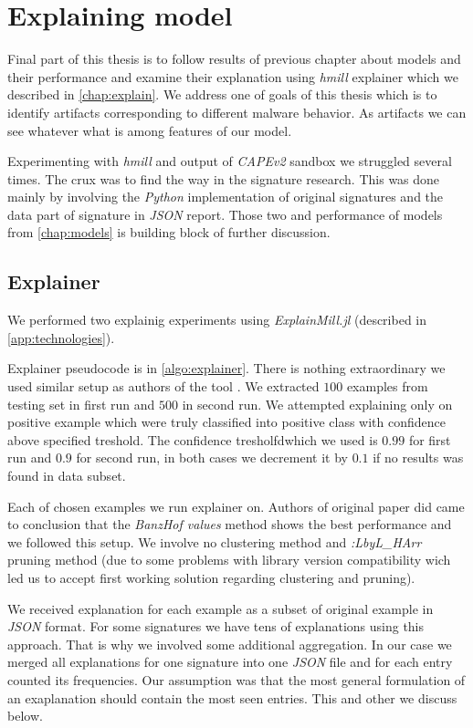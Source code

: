 \chapter{Explaining model} \label{chap:expex}
Final part of this thesis is to follow results of previous chapter about models and their performance and examine their explanation using \emph{hmill} explainer \cite{Pevny2020} which we described in \ref{chap:explain}. We address one of goals of this thesis which is to identify artifacts corresponding to different malware behavior. As artifacts we can see whatever what is among features of our model.

Experimenting with \emph{hmill} and output of \emph{CAPEv2} sandbox we struggled several times. The crux was to find the way in the signature research. This was done mainly by involving the \emph{Python} implementation of original signatures and the data part of signature in \emph{JSON} report. Those two and performance of models from \ref{chap:models} is building block of further discussion.

\section{Explainer}
We performed two explainig experiments using \emph{ExplainMill.jl} (described in \ref{app:technologies}). 

Explainer pseudocode is in \ref{algo:explainer}. There is nothing extraordinary we used similar setup as authors of the tool \cite{Pevny2020}. We extracted $100$ examples from testing set in first run and $500$ in second run. We attempted explaining only on positive example which were truly classified into positive class with confidence above specified treshold. The confidence tresholfdwhich we used is $0.99$ for first run and $0.9$ for second run, in both cases we decrement it by $0.1$ if no results was found in data subset.

Each of chosen examples we run explainer on. Authors of original paper did came to conclusion that the \emph{BanzHof values} method shows the best performance and we followed this setup. We involve no clustering method and \emph{:LbyL_HArr}  pruning method (due to some problems with library version compatibility wich led us to accept first working solution regarding clustering and pruning).

We received explanation for each example as a subset of original example in \emph{JSON} format. For some signatures we have tens of explanations using this approach. That is why we involved some additional aggregation. In our case we merged all explanations for one signature into one \emph{JSON} file and for each entry counted its frequencies. Our assumption was that the most general formulation of an exaplanation should contain the most seen entries. This and other we discuss below.

